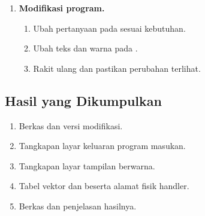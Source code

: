 \begin{enumerate}
\begin{enumerate}
\begin{lstlisting}[language=MASM, numbers=none]
.MODEL SMALL
.CODE
START:
    MOV AH, 00h     ; baca tombol, menunggu
    INT 16h         ; hasil di AH (scan) dan AL (ASCII)
    MOV AH, 4Ch
    INT 21h
END START
\end{lstlisting}

        \item Rakit, link, lalu jalankan program.
        \item Tekan beberapa tombol dan jelaskan mengapa program baru
              berakhir setelah tombol ditekan.
        \item Periksa isi  setelah  dengan
              .
    \end{enumerate}

    \item \textbf{Modifikasi program.}
    \begin{enumerate}
        \item Ubah pertanyaan pada  sesuai
              kebutuhan.
        \item Ubah teks dan warna pada .
        \item Rakit ulang dan pastikan perubahan terlihat.
    \end{enumerate}
\end{enumerate}

\subsection{Hasil yang Dikumpulkan}

\begin{enumerate}
    \item Berkas  dan 
          versi modifikasi.
    \item Tangkapan layar keluaran program masukan.
    \item Tangkapan layar tampilan berwarna.
    \item Tabel vektor  dan  beserta
          alamat fisik handler.
    \item Berkas  dan penjelasan hasilnya.
\end{enumerate}


